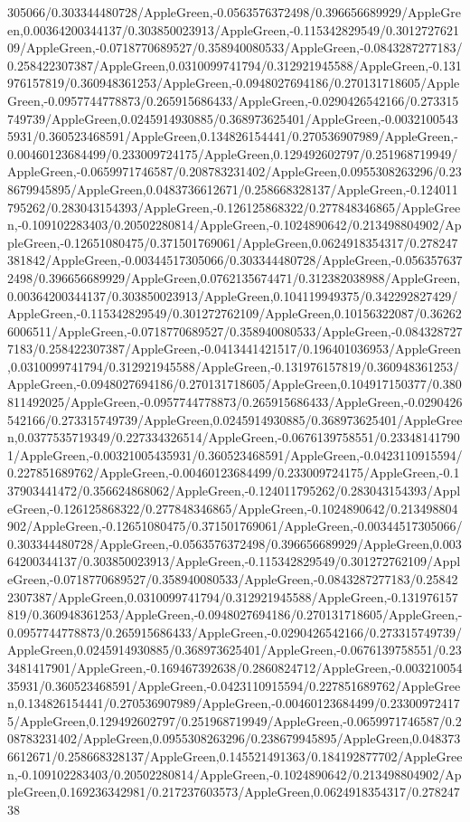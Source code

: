 {\begin{tikzternal}
{305066/0.303344480728/AppleGreen,-0.0563576372498/0.396656689929/AppleGreen,0.00364200344137/0.303850023913/AppleGreen,-0.115342829549/0.301272762109/AppleGreen,-0.0718770689527/0.358940080533/AppleGreen,-0.0843287277183/0.258422307387/AppleGreen,0.0310099741794/0.312921945588/AppleGreen,-0.131976157819/0.360948361253/AppleGreen,-0.0948027694186/0.270131718605/AppleGreen,-0.0957744778873/0.265915686433/AppleGreen,-0.0290426542166/0.273315749739/AppleGreen,0.0245914930885/0.368973625401/AppleGreen,-0.00321005435931/0.360523468591/AppleGreen,0.134826154441/0.270536907989/AppleGreen,-0.00460123684499/0.233009724175/AppleGreen,0.129492602797/0.251968719949/AppleGreen,-0.0659971746587/0.208783231402/AppleGreen,0.0955308263296/0.238679945895/AppleGreen,0.0483736612671/0.258668328137/AppleGreen,-0.124011795262/0.283043154393/AppleGreen,-0.126125868322/0.277848346865/AppleGreen,-0.109102283403/0.20502280814/AppleGreen,-0.1024890642/0.213498804902/AppleGreen,-0.12651080475/0.371501769061/AppleGreen,0.0624918354317/0.278247381842/AppleGreen,-0.00344517305066/0.303344480728/AppleGreen,-0.0563576372498/0.396656689929/AppleGreen,0.0762135674471/0.312382038988/AppleGreen,0.00364200344137/0.303850023913/AppleGreen,0.104119949375/0.342292827429/AppleGreen,-0.115342829549/0.301272762109/AppleGreen,0.10156322087/0.362626006511/AppleGreen,-0.0718770689527/0.358940080533/AppleGreen,-0.0843287277183/0.258422307387/AppleGreen,-0.0413441421517/0.196401036953/AppleGreen,0.0310099741794/0.312921945588/AppleGreen,-0.131976157819/0.360948361253/AppleGreen,-0.0948027694186/0.270131718605/AppleGreen,0.104917150377/0.380811492025/AppleGreen,-0.0957744778873/0.265915686433/AppleGreen,-0.0290426542166/0.273315749739/AppleGreen,0.0245914930885/0.368973625401/AppleGreen,0.0377535719349/0.227334326514/AppleGreen,-0.0676139758551/0.233481417901/AppleGreen,-0.00321005435931/0.360523468591/AppleGreen,-0.0423110915594/0.227851689762/AppleGreen,-0.00460123684499/0.233009724175/AppleGreen,-0.137903441472/0.356624868062/AppleGreen,-0.124011795262/0.283043154393/AppleGreen,-0.126125868322/0.277848346865/AppleGreen,-0.1024890642/0.213498804902/AppleGreen,-0.12651080475/0.371501769061/AppleGreen,-0.00344517305066/0.303344480728/AppleGreen,-0.0563576372498/0.396656689929/AppleGreen,0.00364200344137/0.303850023913/AppleGreen,-0.115342829549/0.301272762109/AppleGreen,-0.0718770689527/0.358940080533/AppleGreen,-0.0843287277183/0.258422307387/AppleGreen,0.0310099741794/0.312921945588/AppleGreen,-0.131976157819/0.360948361253/AppleGreen,-0.0948027694186/0.270131718605/AppleGreen,-0.0957744778873/0.265915686433/AppleGreen,-0.0290426542166/0.273315749739/AppleGreen,0.0245914930885/0.368973625401/AppleGreen,-0.0676139758551/0.233481417901/AppleGreen,-0.169467392638/0.2860824712/AppleGreen,-0.00321005435931/0.360523468591/AppleGreen,-0.0423110915594/0.227851689762/AppleGreen,0.134826154441/0.270536907989/AppleGreen,-0.00460123684499/0.233009724175/AppleGreen,0.129492602797/0.251968719949/AppleGreen,-0.0659971746587/0.208783231402/AppleGreen,0.0955308263296/0.238679945895/AppleGreen,0.0483736612671/0.258668328137/AppleGreen,0.145521491363/0.184192877702/AppleGreen,-0.109102283403/0.20502280814/AppleGreen,-0.1024890642/0.213498804902/AppleGreen,0.169236342981/0.217237603573/AppleGreen,0.0624918354317/0.27824738}
\end{tikzternal}}
